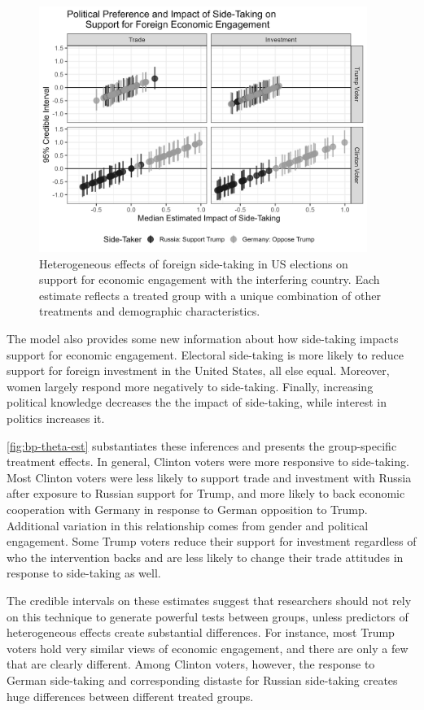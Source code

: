 \documentclass[12pt]{article}
\begin{document}
\begin{figure}[htpb]
	\centering
		\includegraphics[width=0.95\textwidth]{../figures/bp-theta-est.png}
	\caption{Heterogeneous effects of foreign side-taking in US elections on support for economic engagement with the interfering country. Each estimate reflects a treated group with a unique combination of other treatments and demographic characteristics.}
	\label{fig:bp-theta-est}
\end{figure}


The model also provides some new information about how side-taking impacts support for economic engagement. 
Electoral side-taking is more likely to reduce support for foreign investment in the United States, all else equal. 
Moreover, women largely respond more negatively to side-taking. 
Finally, increasing political knowledge decreases the the impact of side-taking, while interest in politics increases it. 


\autoref{fig:bp-theta-est} substantiates these inferences and presents the group-specific treatment effects. 
In general, Clinton voters were more responsive to side-taking. 
Most Clinton voters were less likely to support trade and investment with Russia after exposure to Russian support for Trump, and more likely to back economic cooperation with Germany in response to German opposition to Trump. 
Additional variation in this relationship comes from gender and political engagement.
Some Trump voters reduce their support for investment regardless of who the intervention backs and are less likely to change their trade attitudes in response to side-taking as well. 


The credible intervals on these estimates suggest that researchers should not rely on this technique to generate powerful tests between groups, unless predictors of heterogeneous effects create substantial differences. 
For instance, most Trump voters hold very similar views of economic engagement, and there are only a few that are clearly different. 
Among Clinton voters, however, the response to German side-taking and corresponding distaste for Russian side-taking creates huge differences between different treated groups. 





\newpage
\singlespace
 
 
\end{document}
